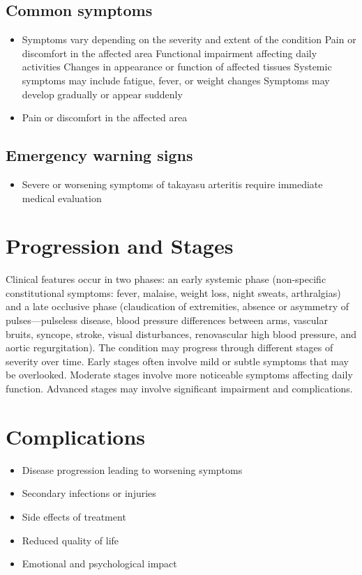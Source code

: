 \subsection{Common symptoms}
\begin{itemize}[noitemsep]
  \item Symptoms vary depending on the severity and extent of the condition Pain or discomfort in the affected area Functional impairment affecting daily activities Changes in appearance or function of affected tissues Systemic symptoms may include fatigue, fever, or weight changes Symptoms may develop gradually or appear suddenly
  \item Pain or discomfort in the affected area
  \end{itemize}

\subsection{Emergency warning signs}
\begin{itemize}[noitemsep]
  \item Severe or worsening symptoms of takayasu arteritis require immediate medical evaluation
\end{itemize}
\section{Progression and Stages}
Clinical features occur in two phases: an early systemic phase (non-specific constitutional symptoms: fever, malaise, weight loss, night sweats, arthralgias) and a late occlusive phase (claudication of extremities, absence or asymmetry of pulses---pulseless disease, blood pressure differences between arms, vascular bruits, syncope, stroke, visual disturbances, renovascular high blood pressure, and aortic regurgitation). The condition may progress through different stages of severity over time. Early stages often involve mild or subtle symptoms that may be overlooked. Moderate stages involve more noticeable symptoms affecting daily function. Advanced stages may involve significant impairment and complications.
\section{Complications}
\begin{itemize}[noitemsep]
  \item Disease progression leading to worsening symptoms
  \item Secondary infections or injuries
  \item Side effects of treatment
  \item Reduced quality of life
  \item Emotional and psychological impact
\end{itemize}
